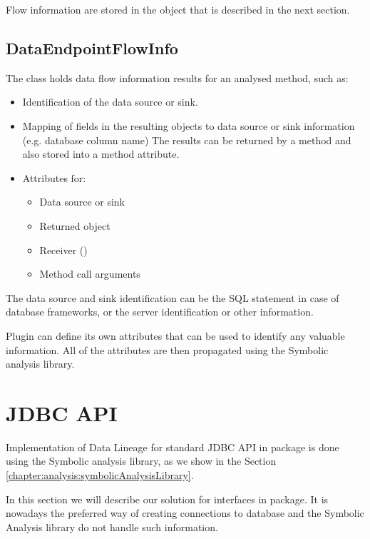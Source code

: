 Flow information are stored in the  object that
is described in the next section.



\subsection{DataEndpointFlowInfo}

The class  holds data flow information results
for an analysed method, such as:
\begin{itemize}
  \item Identification of the data source or sink.
  \item Mapping of fields in the resulting objects to data source or sink information (e.g. database column name)
    The results can be returned by a method and also stored into a method attribute.
  \item Attributes for:
    \begin{itemize}
      \item Data source or sink
      \item Returned object
      \item Receiver ()
      \item Method call arguments
    \end{itemize}
\end{itemize}

The data source and sink identification can be the SQL statement in case of database frameworks,
or the server identification or other information.

Plugin can define its own attributes that can be used to identify any valuable information.
All of the attributes are then propagated using the Symbolic analysis library.




\section{JDBC API \label{implementation:jdbc}}

Implementation of Data Lineage for standard JDBC API in  package
is done using the Symbolic analysis library, as we show in the Section \ref{chapter:analysis:symbolicAnalysisLibrary}.

In this section we will describe our solution for  interfaces in  package.
It is nowadays the preferred way of creating connections to database and the Symbolic Analysis
library do not handle such information.



